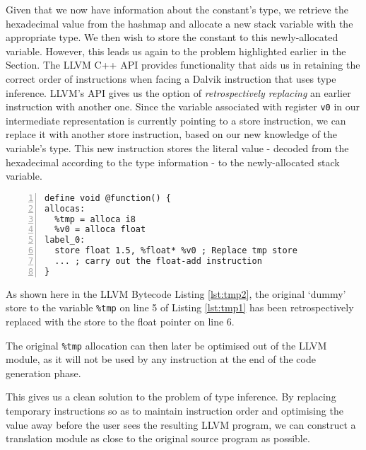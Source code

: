 Given that we now have information about the constant's type, we retrieve the hexadecimal value from the hashmap and allocate a new stack variable with the appropriate type. We then wish to store the constant to this newly-allocated variable. However, this leads us again to the problem highlighted earlier in the Section. The LLVM C++ API provides functionality that aids us in retaining the correct order of instructions when facing a Dalvik instruction that uses type inference. LLVM's API gives us the option of \textit{retrospectively replacing} an earlier instruction with another one. Since the variable associated with register \verb|v0| in our intermediate representation is currently pointing to a store instruction, we can replace it with another store instruction, based on our new knowledge of the variable's type. This new instruction stores the literal value - decoded from the hexadecimal according to the type information - to the newly-allocated stack variable.

\begin{lstlisting}[frame=single, numbers=left, numberstyle=\tiny, caption={LLVM bytecode handling type inference (cont.)}, label=lst:tmp2]
define void @function() {
allocas:
  %tmp = alloca i8
  %v0 = alloca float
label_0:
  store float 1.5, %float* %v0 ; Replace tmp store
  ... ; carry out the float-add instruction
}
\end{lstlisting}

As shown here in the LLVM Bytecode Listing \ref{lst:tmp2}, the original `dummy' store to the variable \verb|%tmp| on line 5 of Listing \ref{lst:tmp1} has been retrospectively replaced with the store to the float pointer on line 6.

The original \verb|%tmp| allocation can then later be optimised out of the LLVM module, as it will not be used by any instruction at the end of the code generation phase.

This gives us a clean solution to the problem of type inference. By replacing temporary instructions so as to maintain instruction order and optimising the value away before the user sees the resulting LLVM program, we can construct a translation module as close to the original source program as possible.

